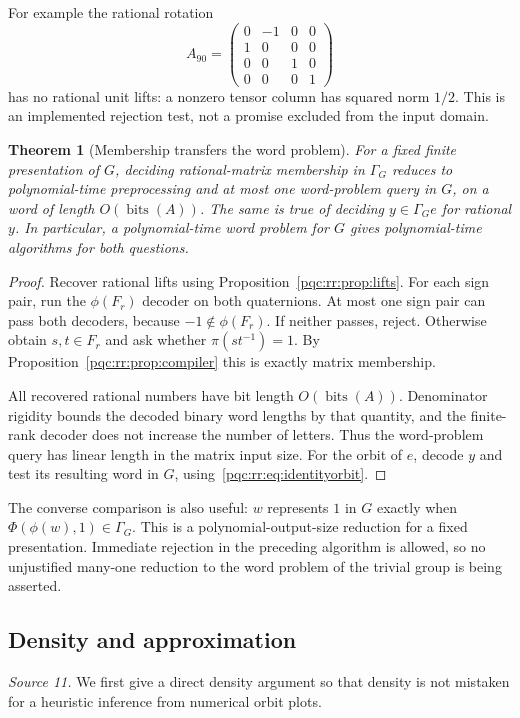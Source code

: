 \documentclass[11pt,letterpaper]{article}
\numberwithin{equation}{section}
\newtheorem{theorem}{Theorem}[section]
\theoremstyle{definition}
\theoremstyle{remark}
\newcommand{\bits}{\operatorname{bits}}
\begin{document}
For example the rational rotation
\[
 A_{90}=\begin{pmatrix}
 0&-1&0&0\\1&0&0&0\\0&0&1&0\\0&0&0&1
 \end{pmatrix}
\]
has no rational unit lifts: a nonzero tensor column has squared norm
$1/2$. This is an implemented rejection test, not a promise excluded from
the input domain.

\begin{theorem}[Membership transfers the word problem]\label{pqc:rr:thm:membership}
For a fixed finite presentation of $G$, deciding rational-matrix membership
in $\Gamma_G$ reduces to polynomial-time preprocessing and at most one
word-problem query in $G$, on a word of length $O(\bits(A))$. The same is
true of deciding $y\in\Gamma_Ge$ for rational $y$. In particular, a
polynomial-time word problem for $G$ gives polynomial-time algorithms for
both questions.
\end{theorem}
\begin{proof}
Recover rational lifts using Proposition~\ref{pqc:rr:prop:lifts}. For each sign
pair, run the $\phi(F_r)$ decoder on both quaternions. At most one sign
pair can pass both decoders, because $-1\notin\phi(F_r)$. If neither
passes, reject. Otherwise obtain $s,t\in F_r$ and ask whether
$\pi(st^{-1})=1$. By Proposition~\ref{pqc:rr:prop:compiler} this is exactly
matrix membership.

All recovered rational numbers have bit length $O(\bits(A))$.
Denominator rigidity bounds the decoded binary word lengths by that
quantity, and the finite-rank decoder does not increase the number of
letters. Thus the word-problem query has linear length in the matrix
input size. For the orbit of $e$, decode $y$ and test its resulting word
in $G$, using~\eqref{pqc:rr:eq:identityorbit}.
\end{proof}

The converse comparison is also useful: $w$ represents $1$ in $G$ exactly
when $\Phi(\phi(w),1)\in\Gamma_G$. This is a polynomial-output-size
reduction for a fixed presentation. Immediate rejection in the preceding
algorithm is allowed, so no unjustified many-one reduction to the word
problem of the trivial group is being asserted.

\subsection{Density and approximation}
\label{pqc:rr:sec:density}\label{pqc:gates:sec:density}
\emph{Source 11.}
We first give a direct density argument so that density is not mistaken
for a heuristic inference from numerical orbit plots.
\end{document}
